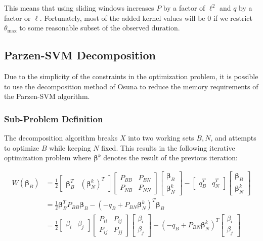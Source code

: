 \documentclass[10pt]{article}
\begin{document}
This means that using sliding windows increases \( P \) by a factor of \( \ell^2 \) and \( q \) by a factor or \( \ell \).  Fortunately, most of the added kernel values will be \(0\) if we restrict \(\theta_\text{max}\) to some reasonable subset of the observed duration.


\subsection{ Parzen-SVM Decomposition }

Due to the simplicity of the constraints in the optimization problem, it is possible to use the decomposition method of Osuna to reduce the memory requirements of the Parzen-SVM algorithm.

\subsubsection{ Sub-Problem Definition }
The decomposition algorithm breaks \(X\) into two working sets \(B,N\), and attempts to optimize \(B\) while keeping \(N\) fixed.  This results in the following iterative optimization problem where \(\boldsymbol{\beta}^k\) denotes the result of the previous iteration:

\begin{align*}
W(\boldsymbol{\beta}_B) &= \frac{1}{2} 
\begin{bmatrix} \boldsymbol{\beta}_B^T & ( \boldsymbol{\beta}_N^k )^T \end{bmatrix} 
\begin{bmatrix} P_{BB} & P_{BN} \\ P_{NB} & P_{NN} \end{bmatrix} 
\begin{bmatrix} \boldsymbol{\beta}_B \\ \boldsymbol{\beta}_N^k \end{bmatrix} - 
\begin{bmatrix} q_B^T & q_N^T \end{bmatrix} 
\begin{bmatrix} \boldsymbol{\beta}_B \\ \boldsymbol{\beta}_N^k \end{bmatrix} \\
&= \frac{1}{2} \boldsymbol{\beta}_B^T P_{BB} \boldsymbol{\beta}_B - ( -q_B + P_{BN} \boldsymbol{\beta}_N^k )^T \boldsymbol{\beta}_B 
\\
&= \frac{1}{2} 
\begin{bmatrix} \beta_i & \beta_j \end{bmatrix}
\begin{bmatrix} P_{ii} & P_{ij} \\ P_{ij} & P_{jj} \end{bmatrix}
\begin{bmatrix} \beta_i \\ \beta_j \end{bmatrix}
- ( -q_B + P_{BN} \boldsymbol{\beta}_N^k )^T
\begin{bmatrix} \beta_i \\ \beta_j \end{bmatrix}
\end{align*}
\end{document}
